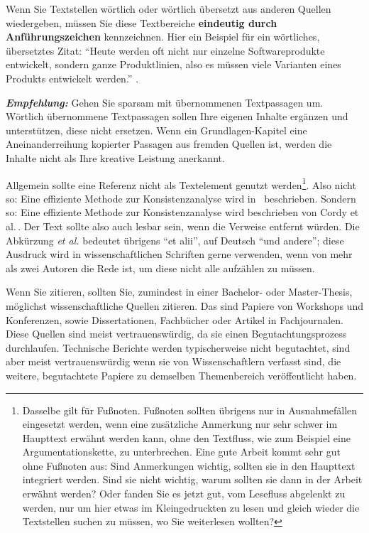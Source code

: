 Wenn Sie Textstellen wörtlich oder wörtlich übersetzt aus anderen Quellen wiedergeben, müssen Sie diese Textbereiche \textbf{eindeutig durch Anführungszeichen} kennzeichnen.
Hier ein Beispiel für ein wörtliches, übersetztes Zitat: \enquote{Heute werden oft nicht nur einzelne Softwareprodukte entwickelt, sondern ganze Produktlinien, also es müssen viele Varianten eines Produkts entwickelt werden.} \cite[Seite~1]{Greenyer2013}.

\textbf{\textit{Empfehlung:}} Gehen Sie sparsam mit übernommenen Textpassagen um. Wörtlich übernommene Textpassagen sollen Ihre eigenen Inhalte ergänzen und unterstützen, diese nicht ersetzen. Wenn ein Grundlagen-Kapitel eine Aneinanderreihung kopierter Passagen aus fremden Quellen ist, werden die Inhalte nicht als Ihre kreative Leistung anerkannt.

Allgemein sollte eine Referenz nicht als Textelement genutzt werden\footnote{Dasselbe gilt für Fußnoten. Fußnoten sollten übrigens nur in Ausnahmefällen eingesetzt werden, wenn eine zusätzliche Anmerkung nur sehr schwer im Haupttext erwähnt werden kann, ohne den Textfluss, wie zum Beispiel eine Argumentationskette, zu unterbrechen. Eine gute Arbeit kommt sehr gut ohne Fußnoten aus: Sind Anmerkungen wichtig, sollten sie in den Haupttext integriert werden. Sind sie nicht wichtig, warum sollten sie dann in der Arbeit erwähnt werden? Oder fanden Sie es jetzt gut, vom Lesefluss abgelenkt zu werden, nur um hier etwas im Kleingedruckten zu lesen und gleich wieder die Textstellen suchen zu müssen, wo Sie weiterlesen wollten?}. Also nicht so: Eine effiziente Methode zur Konsistenzanalyse wird in~\cite{Cordy2012} beschrieben. Sondern so: Eine effiziente Methode zur Konsistenzanalyse wird beschrieben von Cordy et al.\,\cite{Cordy2012}. Der Text sollte also auch lesbar sein, wenn die Verweise entfernt würden. Die Abkürzung \textit{et al.} bedeutet übrigens \enquote{et alii}, auf Deutsch \enquote{und andere}; diese Ausdruck wird in wissenschaftlichen Schriften gerne verwenden, wenn von mehr als zwei Autoren die Rede ist, um diese nicht alle aufzählen zu müssen.

Wenn Sie zitieren, sollten Sie, zumindest in einer Bachelor- oder Master-Thesis, möglichst wissenschaftliche Quellen zitieren. Das sind Papiere von Workshops und Konferenzen, sowie Dissertationen, Fachbücher oder Artikel in Fachjournalen. Diese Quellen sind meist vertrauenswürdig, da sie einen Begutachtungsprozess durchlaufen. Technische Berichte werden typischerweise nicht begutachtet, sind aber meist vertrauenswürdig wenn sie von Wissenschaftlern verfasst sind, die weitere, begutachtete Papiere zu demselben Themenbereich veröffentlicht haben.

